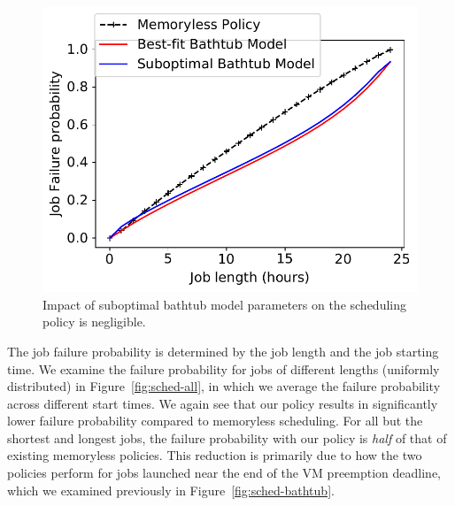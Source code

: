 \begin{figure}
\begin{minipage}[c]{0.3\linewidth}
    \includegraphics[width=\linewidth]{../graphs/wrong-model.pdf}
    \vspace*{-0.8cm}
  \caption{Impact of suboptimal bathtub model parameters on the scheduling policy is negligible.}
  \label{fig:wrong-model}
\end{minipage}
\vspace*{-0.4cm}
\end{figure}



The job failure probability is determined by the job length and the job starting time.
We examine the failure probability for jobs of different lengths (uniformly distributed) in Figure~\ref{fig:sched-all}, in which we average the failure probability across different start times.
We again see that our policy results in significantly lower failure probability compared to memoryless scheduling.
For all but the shortest and longest jobs, the failure probability with our policy is \emph{half} of that of existing memoryless policies. 
This reduction is primarily due to how the two policies perform for jobs launched near the end of the VM preemption deadline, which we examined previously in Figure~\ref{fig:sched-bathtub}. 

